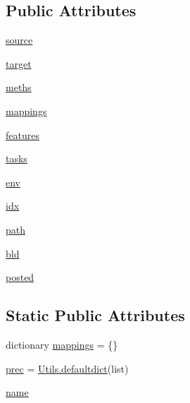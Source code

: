 \subsection*{Public Attributes}
\begin{DoxyCompactItemize}
\item 
\hyperlink{classwaflib_1_1_task_gen_1_1task__gen_a4451a5b4a20507c85eafc2f32493ee87}{source}
\item 
\hyperlink{classwaflib_1_1_task_gen_1_1task__gen_a0d78aaea7bb63815b6d48575c8543a0f}{target}
\item 
\hyperlink{classwaflib_1_1_task_gen_1_1task__gen_a17729accdb4ea3e76aacb4ff161b4d81}{meths}
\item 
\hyperlink{classwaflib_1_1_task_gen_1_1task__gen_a690d02a65e06013d4be47c1ed8728650}{mappings}
\item 
\hyperlink{classwaflib_1_1_task_gen_1_1task__gen_a34a129d5641c33405e46c3b3936742f2}{features}
\item 
\hyperlink{classwaflib_1_1_task_gen_1_1task__gen_abe1e9f4af2e65d6f168e38cf7725bd25}{tasks}
\item 
\hyperlink{classwaflib_1_1_task_gen_1_1task__gen_a4d6f968ce8718fdf77d46ea3b56def1e}{env}
\item 
\hyperlink{classwaflib_1_1_task_gen_1_1task__gen_aa2f14ba06acda993094f0e84ed50bc0c}{idx}
\item 
\hyperlink{classwaflib_1_1_task_gen_1_1task__gen_a2de94fdefeb1c3f9ca6ee435b985015e}{path}
\item 
\hyperlink{classwaflib_1_1_task_gen_1_1task__gen_afd69db351beea23b48491799630fcec0}{bld}
\item 
\hyperlink{classwaflib_1_1_task_gen_1_1task__gen_ae7757dd09f5aaccfabfd2ccbf169583c}{posted}
\end{DoxyCompactItemize}
\subsection*{Static Public Attributes}
\begin{DoxyCompactItemize}
\item 
dictionary \hyperlink{classwaflib_1_1_task_gen_1_1task__gen_ada504359c458b7f0ab7997d2f43496e9}{mappings} = \{\}
\item 
\hyperlink{classwaflib_1_1_task_gen_1_1task__gen_a67aa5c02828705081c1494c085b4b8b3}{prec} = \hyperlink{classwaflib_1_1_utils_1_1defaultdict}{Utils.\+defaultdict}(list)
\item 
\hyperlink{classwaflib_1_1_task_gen_1_1task__gen_a7b6e6e8acde75e70f742064d6a60011d}{name}
\end{DoxyCompactItemize}


